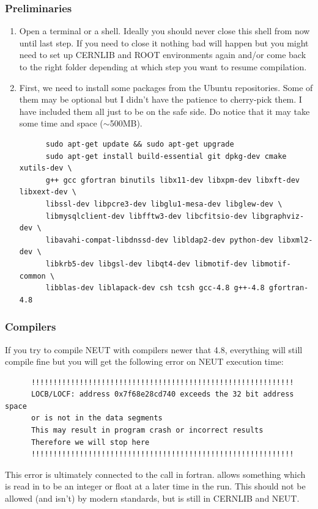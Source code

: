 \subsubsection{Preliminaries}
\begin{enumerate}
\item Open a terminal or a shell. Ideally you should never close this
  shell from now until last step. If you need to close it nothing bad
  will happen but you might need to set up CERNLIB and ROOT
  environments again and/or come back to the right folder depending at
  which step you want to resume compilation.
\item\label{packages} First, we need to install some packages from the Ubuntu
  repositories. Some of them may be optional but I didn't have the
  patience to cherry-pick them. I have included them all just to be on
  the safe side. Do notice that it may take some time and space
  ($\sim$500MB).
\begin{lstlisting}
      sudo apt-get update && sudo apt-get upgrade
      sudo apt-get install build-essential git dpkg-dev cmake xutils-dev \
      g++ gcc gfortran binutils libx11-dev libxpm-dev libxft-dev libxext-dev \
      libssl-dev libpcre3-dev libglu1-mesa-dev libglew-dev \
      libmysqlclient-dev libfftw3-dev libcfitsio-dev libgraphviz-dev \
      libavahi-compat-libdnssd-dev libldap2-dev python-dev libxml2-dev \
      libkrb5-dev libgsl-dev libqt4-dev libmotif-dev libmotif-common \
      libblas-dev liblapack-dev csh tcsh gcc-4.8 g++-4.8 gfortran-4.8
\end{lstlisting}
\end{enumerate}

\subsubsection{Compilers}\label{compiler}
If you try to compile NEUT with compilers newer that 4.8, everything
will still compile fine but you will get the
following error on NEUT execution time:
\begin{lstlisting}
      !!!!!!!!!!!!!!!!!!!!!!!!!!!!!!!!!!!!!!!!!!!!!!!!!!!!!!!!!!!!
      LOCB/LOCF: address 0x7f68e28cd740 exceeds the 32 bit address space
      or is not in the data segments
      This may result in program crash or incorrect results
      Therefore we will stop here
      !!!!!!!!!!!!!!!!!!!!!!!!!!!!!!!!!!!!!!!!!!!!!!!!!!!!!!!!!!!!
\end{lstlisting}
This error is ultimately connected to the \cleanstyle{FFKEY} call in
fortran. \cleanstyle{FFKEY} allows something which is read in to 
be an integer or float at a later time in the run. This should not 
be allowed (and isn't) by modern standards, but is still in CERNLIB
and NEUT.\@ 

